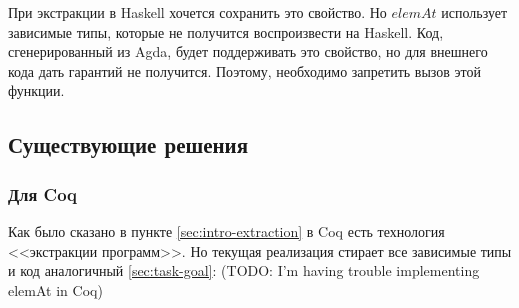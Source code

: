 При экстракции в Haskell хочется сохранить это свойство. Но \(elemAt\)
использует зависимые типы, которые не получится воспроизвести на Haskell.
Код, сгенерированный из Agda, будет поддерживать это свойство, но для
внешнего кода дать гарантий не получится. Поэтому, необходимо запретить
вызов этой функции.

\subsection{Существующие решения}

\subsubsection{Для Coq}

Как было сказано в пункте \ref{sec:intro-extraction} в Coq есть технология
<<экстракции программ>>. Но текущая реализация стирает все зависимые типы и
код аналогичный \ref{sec:task-goal}: (TODO: I'm having trouble implementing elemAt in Coq)

